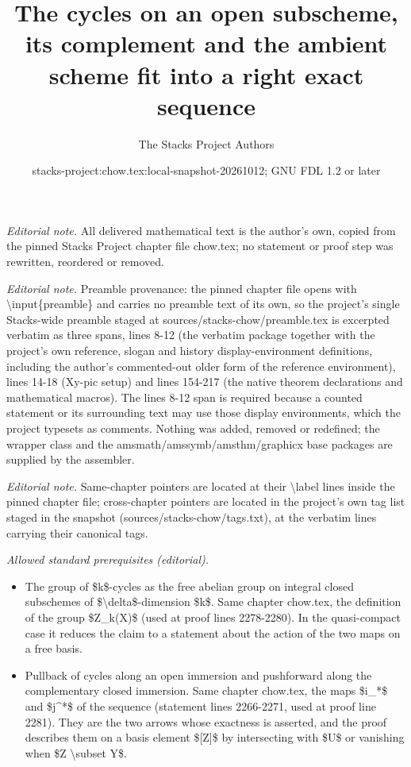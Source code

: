 \documentclass[10pt,a4paper]{amsart}
\title{The cycles on an open subscheme, its complement and the ambient scheme fit into a right exact sequence}
\author{The Stacks Project Authors}
\date{stacks-project:chow.tex:local-snapshot-20261012; GNU FDL 1.2 or later}
\theoremstyle{plain}
\theoremstyle{definition}
\theoremstyle{remark}
\numberwithin{equation}{subsection}
\begin{document}
\maketitle
\noindent\textit{Editorial note.} All delivered mathematical text is the author's own, copied from the pinned Stacks Project chapter file chow.tex; no statement or proof step was rewritten, reordered or removed.\par\medskip
\noindent\textit{Editorial note.} Preamble provenance: the pinned chapter file opens with \textbackslash{}input\{preamble\} and carries no preamble text of its own, so the project's single Stacks-wide preamble staged at sources/stacks-chow/preamble.tex is excerpted verbatim as three spans, lines 8-12 (the verbatim package together with the project's own reference, slogan and history display-environment definitions, including the author's commented-out older form of the reference environment), lines 14-18 (Xy-pic setup) and lines 154-217 (the native theorem declarations and mathematical macros). The lines 8-12 span is required because a counted statement or its surrounding text may use those display environments, which the project typesets as comments. Nothing was added, removed or redefined; the wrapper class and the amsmath/amssymb/amsthm/graphicx base packages are supplied by the assembler.\par\medskip
\noindent\textit{Editorial note.} Same-chapter pointers are located at their \textbackslash{}label lines inside the pinned chapter file; cross-chapter pointers are located in the project's own tag list staged in the snapshot (sources/stacks-chow/tags.txt), at the verbatim lines carrying their canonical tags.\par\medskip
\noindent\textit{Allowed standard prerequisites (editorial).}\begin{itemize}
\item The group of \$k\$-cycles as the free abelian group on integral closed subschemes of \$\textbackslash{}delta\$-dimension \$k\$. Same chapter chow.tex, the definition of the group \$Z\_k(X)\$ (used at proof lines 2278-2280). In the quasi-compact case it reduces the claim to a statement about the action of the two maps on a free basis.
\item Pullback of cycles along an open immersion and pushforward along the complementary closed immersion. Same chapter chow.tex, the maps \$i\_*\$ and \$j\textasciicircum{}*\$ of the sequence (statement lines 2266-2271, used at proof line 2281). They are the two arrows whose exactness is asserted, and the proof describes them on a basis element \$[Z]\$ by intersecting with \$U\$ or vanishing when \$Z \textbackslash{}subset Y\$.
\end{itemize}\medskip
\end{document}
